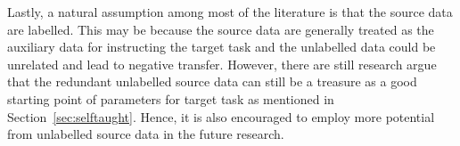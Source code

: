 \documentclass[prodmode]{acmsmall}  %
\begin{document}
Lastly, a natural assumption among most of the literature is that the source data are labelled. This may be because the source data are generally treated as the auxiliary data for instructing the target task and the unlabelled data could be unrelated and lead to negative transfer. However, there are still research argue that the redundant unlabelled source data can still be a treasure as a good starting point of parameters for target task as mentioned in Section~\ref{sec:selftaught}. Hence, it is also encouraged to employ more potential from unlabelled source data in the future research.




\medskip{


}
\end{document}
